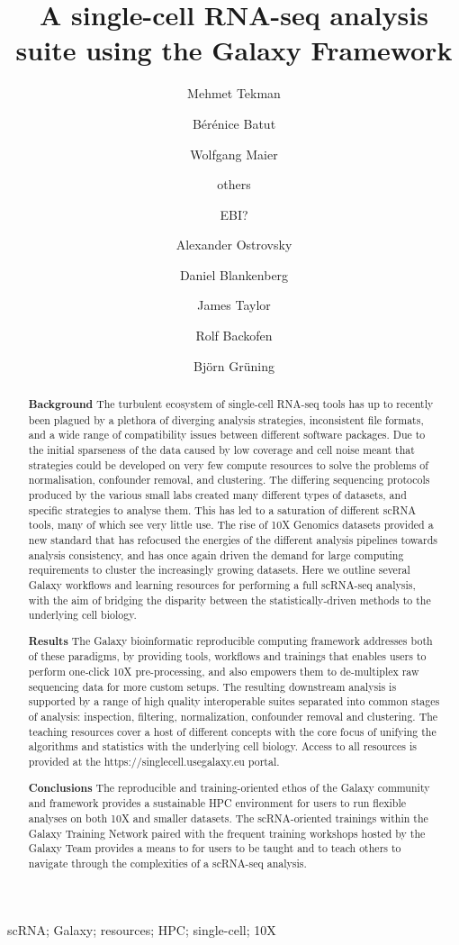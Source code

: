 \documentclass[a4paper,num-refs]{oup-contemporary}
\title{A single-cell RNA-seq analysis suite using the Galaxy Framework}
\author[1,\authfn{1},\authfn{2}]{Mehmet Tekman}
\author[2,\authfn{1},\authfn{2}]{Bérénice Batut}
\author[2,\authfn{1},\authfn{2}]{Wolfgang Maier}
\author[2]{others}
\author[2]{EBI?}
\author[2,\authfn{1},\authfn{2}]{Alexander Ostrovsky}
\author[2,\authfn{1},\authfn{2}]{Daniel Blankenberg}
\author[2,\authfn{1},\authfn{2}]{James Taylor}
\author[1,\authfn{1}]{Rolf Backofen}
\author[1,\authfn{1}]{Björn Grüning}
\affil[1]{Chair of Bioinformatics, University of Freiburg, Freiburg, Germany, }
\affil[2]{Second Institution}
\begin{document}
\begin{frontmatter}
\maketitle
\begin{abstract}
\textbf{Background} The turbulent ecosystem of single-cell RNA-seq tools has up to recently been plagued by a plethora of diverging analysis strategies, inconsistent file formats, and a wide range of compatibility issues between different software packages. Due to the initial sparseness of the data caused by low coverage and cell noise meant that strategies could be developed on very few compute resources to solve the problems of normalisation, confounder removal, and clustering. The differing sequencing protocols produced by the various small labs created many different types of datasets, and specific strategies to analyse them. This has led to a saturation of different scRNA tools, many of which see very little use. The rise of 10X Genomics datasets provided a new standard that has refocused the energies of the different analysis pipelines towards analysis consistency, and has once again driven the demand for large computing requirements to cluster the increasingly growing datasets. Here we outline several Galaxy workflows and learning resources for performing a full scRNA-seq analysis, with the aim of bridging the disparity between the statistically-driven methods to the underlying cell biology.

\textbf{Results}
The Galaxy bioinformatic reproducible computing framework addresses both of these paradigms, by providing tools, workflows and trainings that enables users to perform one-click 10X pre-processing, and also empowers them to de-multiplex raw sequencing data for more custom setups. The resulting downstream analysis is supported by a range of high quality interoperable suites separated into common stages of analysis: inspection, filtering, normalization, confounder removal and clustering. The teaching resources cover a host of different concepts with the core focus of unifying the algorithms and statistics with the underlying cell biology. Access to all resources is provided at the https://singlecell.usegalaxy.eu portal.

\textbf{Conclusions}
The reproducible and training-oriented ethos of the Galaxy community and framework provides a sustainable HPC environment for users to run flexible analyses on both 10X and smaller datasets. The scRNA-oriented trainings within the Galaxy Training Network paired with the frequent training workshops hosted by the Galaxy Team provides a means to for users to be taught and to teach others to navigate through the complexities of a scRNA-seq analysis.
\end{abstract}

\begin{keywords}
scRNA; Galaxy; resources; HPC; single-cell; 10X
\end{keywords}
\end{frontmatter}
\end{document}
